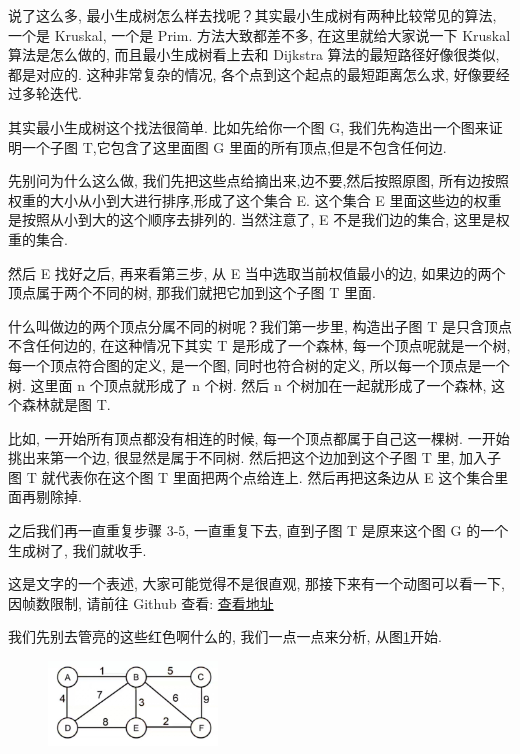 说了这么多, 最小生成树怎么样去找呢？其实最小生成树有两种比较常见的算法, 一个是 Kruskal, 一个是 Prim. 方法大致都差不多, 在这里就给大家说一下 Kruskal 算法是怎么做的, 而且最小生成树看上去和 Dijkstra 算法的最短路径好像很类似, 都是对应的. 这种非常复杂的情况, 各个点到这个起点的最短距离怎么求, 好像要经过多轮迭代. 

其实最小生成树这个找法很简单. 比如先给你一个图 G, 我们先构造出一个图来证明一个子图 T,它包含了这里面图 G 里面的所有顶点,但是不包含任何边.

先别问为什么这么做, 我们先把这些点给摘出来,边不要,然后按照原图, 所有边按照权重的大小从小到大进行排序,形成了这个集合 E. 这个集合 E 里面这些边的权重是按照从小到大的这个顺序去排列的. 当然注意了, E 不是我们边的集合, 这里是权重的集合. 

然后 E 找好之后, 再来看第三步, 从 E 当中选取当前权值最小的边, 如果边的两个顶点属于两个不同的树, 那我们就把它加到这个子图 T 里面. 

什么叫做边的两个顶点分属不同的树呢？我们第一步里, 构造出子图 T 是只含顶点不含任何边的, 在这种情况下其实 T 是形成了一个森林, 每一个顶点呢就是一个树, 每一个顶点符合图的定义, 是一个图, 同时也符合树的定义, 所以每一个顶点是一个树. 这里面 n 个顶点就形成了 n 个树. 然后 n 个树加在一起就形成了一个森林, 这个森林就是图 T. 

比如, 一开始所有顶点都没有相连的时候, 每一个顶点都属于自己这一棵树. 一开始挑出来第一个边, 很显然是属于不同树. 然后把这个边加到这个子图 T 里, 加入子图 T 就代表你在这个图 T 里面把两个点给连上. 然后再把这条边从 E 这个集合里面再剔除掉. 

之后我们再一直重复步骤 3-5, 一直重复下去, 直到子图 T 是原来这个图 G 的一个生成树了, 我们就收手. 

这是文字的一个表述, 大家可能觉得不是很直观, 那接下来有一个动图可以看一下, 因帧数限制, 请前往 Github 查看: \href{https://github.com/hivandu/AI_Cheats/blob/main/math/Minimal%20spanning%20tree.gif}{查看地址}

我们先别去管亮的这些红色啊什么的, 我们一点一点来分析, 从图\ref{fig:img27_6}开始. 

\begin{figure}[ht]
  \centering
  \includegraphics[width=0.4\textwidth]{asset/07406ba2-1bde-448c-a84b-eaf3716aaeb0.jpg}
  \caption{}
  \label{fig:img27_6}
\end{figure}

